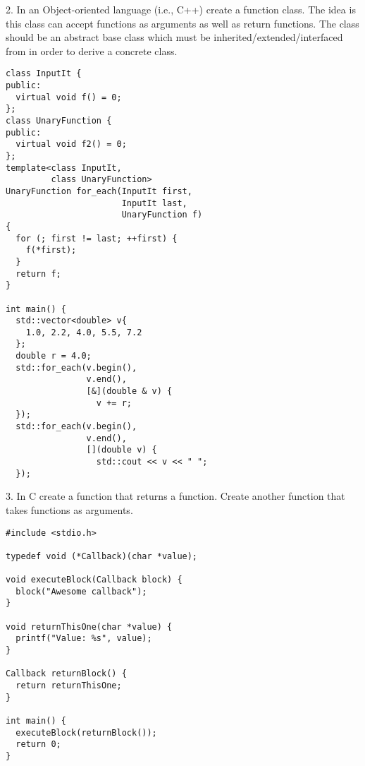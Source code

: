 \documentclass[conference]{IEEEtran}
\begin{document}
2. In an Object-oriented language (i.e., C++) create a function class. The idea is this class can accept functions as arguments as well as return functions. The class should be an abstract base class which must be inherited/extended/interfaced from in order to derive a concrete class.
\lstset{language=c++}
\begin{lstlisting}[frame=single]
class InputIt {
public:
  virtual void f() = 0;
};
class UnaryFunction {
public:
  virtual void f2() = 0;
};
template<class InputIt,
         class UnaryFunction>
UnaryFunction for_each(InputIt first,
                       InputIt last,
                       UnaryFunction f)
{
  for (; first != last; ++first) {
    f(*first);
  }
  return f;
}

int main() {
  std::vector<double> v{
    1.0, 2.2, 4.0, 5.5, 7.2
  };
  double r = 4.0;
  std::for_each(v.begin(),
                v.end(),
                [&](double & v) {
                  v += r;
  });
  std::for_each(v.begin(),
                v.end(),
                [](double v) {
                  std::cout << v << " ";
  });
\end{lstlisting}
3. In C create a function that returns a function. Create another function that takes functions as arguments.
\lstset{language=c}
\begin{lstlisting}[frame=single]
#include <stdio.h>

typedef void (*Callback)(char *value);

void executeBlock(Callback block) {
  block("Awesome callback");
}

void returnThisOne(char *value) {
  printf("Value: %s", value);
}

Callback returnBlock() {
  return returnThisOne;
}

int main() {
  executeBlock(returnBlock());
  return 0;
}
\end{lstlisting}
\end{document}
